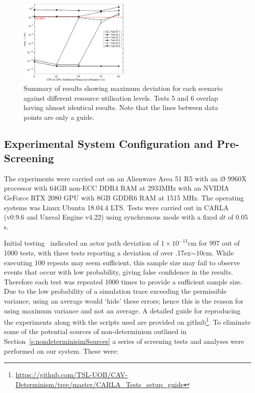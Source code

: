 \begin{figure}[t]
    \centering
    \includegraphics[width=0.48\textwidth]{../other/figures/ExperimentsStressSummaryV6.pdf}
    \caption{Summary of results showing maximum deviation for each scenario against different resource utilisation levels. Tests 5 and 6 overlap having almost identical results. Note that the lines between data points are only a guide.}
    \label{ExperimentsStressSummary}
\end{figure}
  
\subsection{Experimental System Configuration and Pre-Screening}\label{s:screening}
The experiments were carried out on an Alienware Area 51 R5 with an i9 9960X processor with 64GB non-ECC DDR4 RAM at 2933MHz with an NVIDIA GeForce RTX 2080 GPU with 8GB GDDR6 RAM at 1515 MHz. The operating systems was Linux Ubuntu 18.04.4 LTS. Tests were carried out in CARLA (v0.9.6 and Unreal Engine v4.22) using synchronous mode with a fixed $dt$ of $0.05$s. 

Initial testing~\cite{TSLUnrealEngineTesting} indicated an actor path deviation of $1\times10^{-13}$cm for 997 out of 1000 tests, with three tests reporting a deviation of over {\raise.17ex\hbox{$\scriptstyle\sim$}}$10$cm. While executing 100 repeats may seem sufficient, this sample size may fail to observe events that occur with low probability, giving false confidence in the results. Therefore each test was repeated 1000 times to provide a sufficient sample size. 
%
Due to the low probability of a simulation trace exceeding the permissible variance, using an average would `hide' these errors; hence this is the reason for using maximum variance and not an average.
%
A detailed guide for reproducing the experiments along with the scripts used are provided on github\footnote{\url{https://github.com/TSL-UOB/CAV-Determinism/tree/master/CARLA_Tests_setup_guide}}. To eliminate some of the potential sources of non-determinism outlined in Section~\ref{s:nondeterminisimSources} a series of screening tests and analyses were performed on our system. These were:

